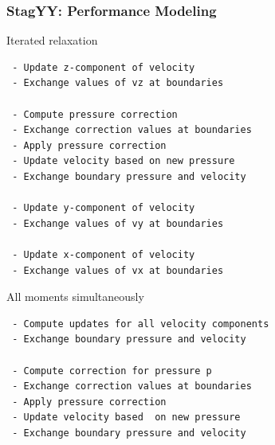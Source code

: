 \begin{frame}[fragile]\frametitle{StagYY: Performance Modeling}

{ \footnotesize
\begin{minipage}{0.45\textwidth}
\begin{block}{Iterated relaxation}
\begin{verbatim}
 - Update z-component of velocity
 - Exchange values of vz at boundaries
 
 - Compute pressure correction
 - Exchange correction values at boundaries
 - Apply pressure correction
 - Update velocity based on new pressure
 - Exchange boundary pressure and velocity
 
 - Update y-component of velocity
 - Exchange values of vy at boundaries

 - Update x-component of velocity
 - Exchange values of vx at boundaries
\end{verbatim}
\end{block}
\end{minipage}
\begin{minipage}{0.45\textwidth}
\begin{block}{All moments simultaneously}
\begin{verbatim}
 - Compute updates for all velocity components
 - Exchange boundary pressure and velocity

 - Compute correction for pressure p
 - Exchange correction values at boundaries
 - Apply pressure correction
 - Update velocity based  on new pressure
 - Exchange boundary pressure and velocity
   
   
   
   
  
   
\end{verbatim}
\end{block}
\end{minipage}
}


\end{frame}


